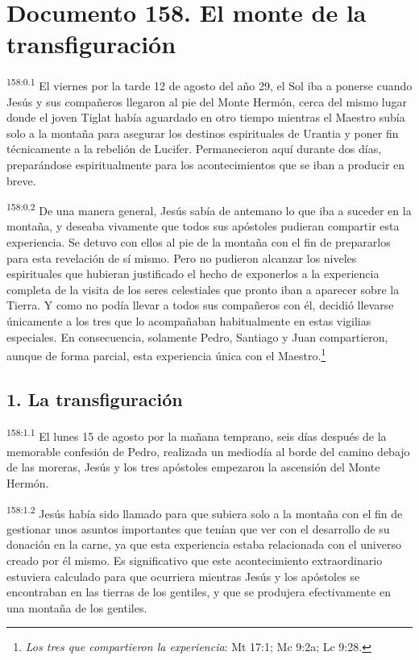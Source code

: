 \chapter{Documento 158. El monte de la transfiguración}
\par 
\textsuperscript{158:0.1} El viernes por la tarde 12 de agosto del año 29, el Sol iba a ponerse cuando Jesús y sus compañeros llegaron al pie del Monte Hermón, cerca del mismo lugar donde el joven Tiglat había aguardado en otro tiempo mientras el Maestro subía solo a la montaña para asegurar los destinos espirituales de Urantia y poner fin técnicamente a la rebelión de Lucifer. Permanecieron aquí durante dos días, preparándose espiritualmente para los acontecimientos que se iban a producir en breve.

\par 
\textsuperscript{158:0.2} De una manera general, Jesús sabía de antemano lo que iba a suceder en la montaña, y deseaba vivamente que todos sus apóstoles pudieran compartir esta experiencia. Se detuvo con ellos al pie de la montaña con el fin de prepararlos para esta revelación de sí mismo. Pero no pudieron alcanzar los niveles espirituales que hubieran justificado el hecho de exponerlos a la experiencia completa de la visita de los seres celestiales que pronto iban a aparecer sobre la Tierra. Y como no podía llevar a todos sus compañeros con él, decidió llevarse únicamente a los tres que lo acompañaban habitualmente en estas vigilias especiales. En consecuencia, solamente Pedro, Santiago y Juan compartieron, aunque de forma parcial, esta experiencia única con el Maestro.\footnote{\textit{Los tres que compartieron la experiencia}: Mt 17:1; Mc 9:2a; Lc 9:28.}

\section*{1. La transfiguración}
\par 
\textsuperscript{158:1.1} El lunes 15 de agosto por la mañana temprano, seis días después de la memorable confesión de Pedro, realizada un mediodía al borde del camino debajo de las moreras, Jesús y los tres apóstoles empezaron la ascensión del Monte Hermón.

\par 
\textsuperscript{158:1.2} Jesús había sido llamado para que subiera solo a la montaña con el fin de gestionar unos asuntos importantes que tenían que ver con el desarrollo de su donación en la carne, ya que esta experiencia estaba relacionada con el universo creado por él mismo. Es significativo que este acontecimiento extraordinario estuviera calculado para que ocurriera mientras Jesús y los apóstoles se encontraban en las tierras de los gentiles, y que se produjera efectivamente en una montaña de los gentiles.

